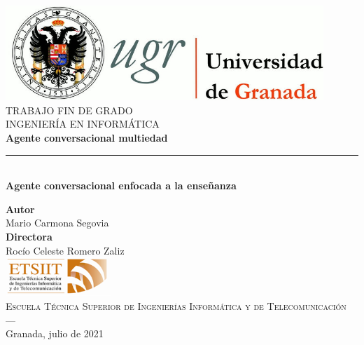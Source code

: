 \begin{titlepage}
 
 
\newlength{\centeroffset}
\setlength{\centeroffset}{-0.5\oddsidemargin}
\addtolength{\centeroffset}{0.5\evensidemargin}
\thispagestyle{empty}

\noindent\hspace*{\centeroffset}\begin{minipage}{\textwidth}

\centering
\includegraphics[width=0.9\textwidth]{imagenes/logo_ugr.jpg}\\[1.4cm]

\textsc{ \Large TRABAJO FIN DE GRADO\\[0.2cm]}
\textsc{ INGENIERÍA EN INFORMÁTICA}\\[1cm]
% 
{\Huge\bfseries Agente conversacional multiedad\\
}
\noindent\rule[-1ex]{\textwidth}{3pt}\\[3.5ex]
{\large\bfseries Agente conversacional enfocada a la enseñanza}
\end{minipage}

\vspace{2.5cm}
\noindent\hspace*{\centeroffset}\begin{minipage}{\textwidth}
\centering

\textbf{Autor}\\ {Mario Carmona Segovia}\\[2.5ex]
\textbf{Directora}\\
{Rocío Celeste Romero Zaliz}\\[2cm]
\includegraphics[width=0.3\textwidth]{imagenes/etsiit_logo.png}\\[0.1cm]
\textsc{Escuela Técnica Superior de Ingenierías Informática y de Telecomunicación}\\
\textsc{---}\\
Granada, julio de 2021
\end{minipage}
\end{titlepage}


